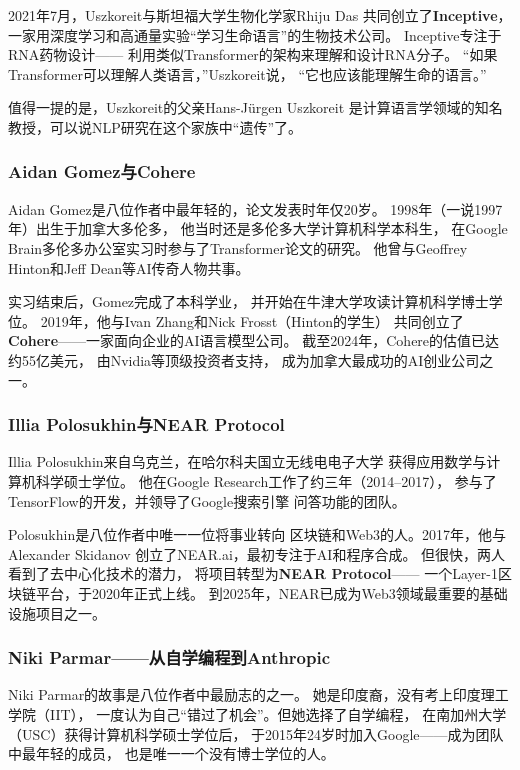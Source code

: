 2021年7月，Uszkoreit与斯坦福大学生物化学家Rhiju Das
共同创立了\textbf{Inceptive}，
一家用深度学习和高通量实验``学习生命语言''的生物技术公司。
Inceptive专注于RNA药物设计——
利用类似Transformer的架构来理解和设计RNA分子。
``如果Transformer可以理解人类语言，''Uszkoreit说，
``它也应该能理解生命的语言。''

值得一提的是，Uszkoreit的父亲Hans-J\"{u}rgen Uszkoreit
是计算语言学领域的知名教授，可以说NLP研究在这个家族中``遗传''了。

\subsubsection{Aidan Gomez与Cohere}
Aidan Gomez是八位作者中最年轻的，论文发表时年仅20岁。
1998年（一说1997年）出生于加拿大多伦多，
他当时还是多伦多大学计算机科学本科生，
在Google Brain多伦多办公室实习时参与了Transformer论文的研究。
他曾与Geoffrey Hinton和Jeff Dean等AI传奇人物共事。

实习结束后，Gomez完成了本科学业，
并开始在牛津大学攻读计算机科学博士学位。
2019年，他与Ivan Zhang和Nick Frosst（Hinton的学生）
共同创立了\textbf{Cohere}——一家面向企业的AI语言模型公司。
截至2024年，Cohere的估值已达约55亿美元，
由Nvidia等顶级投资者支持，
成为加拿大最成功的AI创业公司之一。

\subsubsection{Illia Polosukhin与NEAR Protocol}
Illia Polosukhin来自乌克兰，在哈尔科夫国立无线电电子大学
获得应用数学与计算机科学硕士学位。
他在Google Research工作了约三年（2014--2017），
参与了TensorFlow的开发，并领导了Google搜索引擎
问答功能的团队。

Polosukhin是八位作者中唯一一位将事业转向
区块链和Web3的人。2017年，他与Alexander Skidanov
创立了NEAR.ai，最初专注于AI和程序合成。
但很快，两人看到了去中心化技术的潜力，
将项目转型为\textbf{NEAR Protocol}——
一个Layer-1区块链平台，于2020年正式上线。
到2025年，NEAR已成为Web3领域最重要的基础设施项目之一。

\subsubsection{Niki Parmar——从自学编程到Anthropic}
Niki Parmar的故事是八位作者中最励志的之一。
她是印度裔，没有考上印度理工学院（IIT），
一度认为自己``错过了机会''。但她选择了自学编程，
在南加州大学（USC）获得计算机科学硕士学位后，
于2015年24岁时加入Google——成为团队中最年轻的成员，
也是唯一一个没有博士学位的人。

